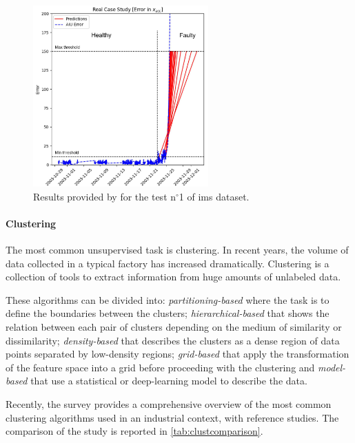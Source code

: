 \begin{figure}
    \centering
    \includegraphics[width=0.6\textwidth]{images/IMS/UmbertoResults.png}
    \caption{Results provided by \cite{Umberto} for the test $\text{n}^\circ$1 of \gls{ims} dataset.}
    \label{fig:umbertoresult}
\end{figure}


\paragraph*{Clustering}
The most common unsupervised task is clustering. In recent years, the volume of data collected in a typical factory has increased dramatically. Clustering is a collection of tools to extract information from huge amounts of unlabeled data. 

These algorithms can be divided into: \emph{partitioning-based} where the task is to define the boundaries between the clusters; \emph{hierarchical-based} that shows the relation between each pair of clusters depending on the medium of similarity or dissimilarity; \emph{density-based} that describes the clusters as a dense region of data points separated by low-density regions; \emph{grid-based} that apply the transformation of the feature space into a grid before proceeding with the clustering and \emph{model-based} that use a statistical or deep-learning model to describe the data.

Recently, the survey \cite{Abla2019survey} provides a comprehensive overview of the most common clustering algorithms used in an industrial context, with reference studies. The comparison of the study is reported in \autoref{tab:clustcomparison}.

{\small}